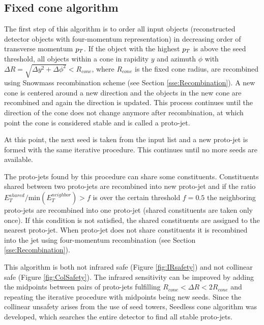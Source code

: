 \subsection{Fixed cone algorithm}

The first step of this algorithm is to order all input objects (reconstructed
detector objects with four-momentum representation) in decreasing order of
transverse momentum $p_{T}$. If the object with the highest $p_{T}$ is above the
seed threshold, all objects within a cone in rapidity $y$ and azimuth
$\phi$ with $\Delta R = \sqrt{\Delta y^2 + \Delta \phi^2} < R_{cone}$, where
$R_{cone}$ is the fixed cone radius, are recombined using Snowmass recombination
scheme (see Section \ref{sse:Recombination}).  A new cone is centered around a
new direction and the objects in the new cone are recombined and again the
direction is updated. This process continues until the direction of the cone
does not change anymore after recombination, at which point the cone is
considered stable and is called a proto-jet. 

At this point, the next seed is taken from the input list and a new proto-jet is
formed with the same iterative procedure. This continues until no more seeds are
available. 

The proto-jets found by this procedure can share some constituents. Constituents
shared between two proto-jets are recombined into new proto-jet and if the ratio
$E_T^{shared} / \text{min} ( E_T^{neighbor} ) > f$ is over the certain threshold
$f = 0.5$ the neighboring proto-jets are recombined into one proto-jet (shared
constituents are taken only once). If this condition is not satisfied, the
shared constituents are assigned to the nearest proto-jet. When proto-jet does
not share constituents it is recombined into the jet using four-momentum
recombination (see Section \ref{sse:Recombination}).

This algorithm is both not infrared safe (Figure \ref{fig:IRsafety}) and not
collinear safe (Figure \ref{fig:ColSafety}). The infrared sensitivity can be
improved by adding the midpoints between pairs of proto-jets fulfilling
$R_{cone} < \Delta R < 2 R_{cone}$ and repeating the iterative procedure with
midpoints being new seeds. Since the collinear unsafety arises from the use of
seed towers, Seedless cone algorithm was developed, which searches the entire
detector to find all stable proto-jets.

